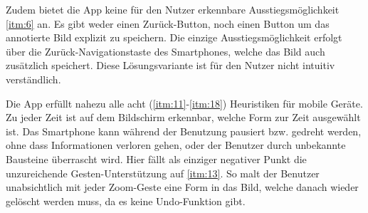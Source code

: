 Zudem bietet die App keine für den Nutzer erkennbare Ausstiegsmöglichkeit \ref{itm:6} an. Es gibt weder einen Zurück-Button, noch einen Button um das annotierte Bild explizit zu speichern. Die einzige Ausstiegsmöglichkeit erfolgt über die Zurück-Navigationstaste des Smartphones, welche das Bild auch zusätzlich speichert. Diese Lösungsvariante ist für den Nutzer nicht intuitiv verständlich. 

Die App erfüllt nahezu alle acht (\ref{itm:11}-\ref{itm:18}) Heuristiken für mobile Geräte. Zu jeder Zeit ist auf dem Bildschirm erkennbar, welche Form zur Zeit ausgewählt ist. Das Smartphone kann während der Benutzung pausiert bzw. gedreht werden, ohne dass Informationen verloren gehen, oder der Benutzer durch unbekannte Bausteine überrascht wird.  Hier fällt als einziger negativer Punkt die unzureichende Gesten-Unterstützung auf \ref{itm:13}. So malt der Benutzer unabsichtlich mit jeder Zoom-Geste eine Form in das Bild, welche danach wieder gelöscht werden muss, da es keine Undo-Funktion gibt. \\

